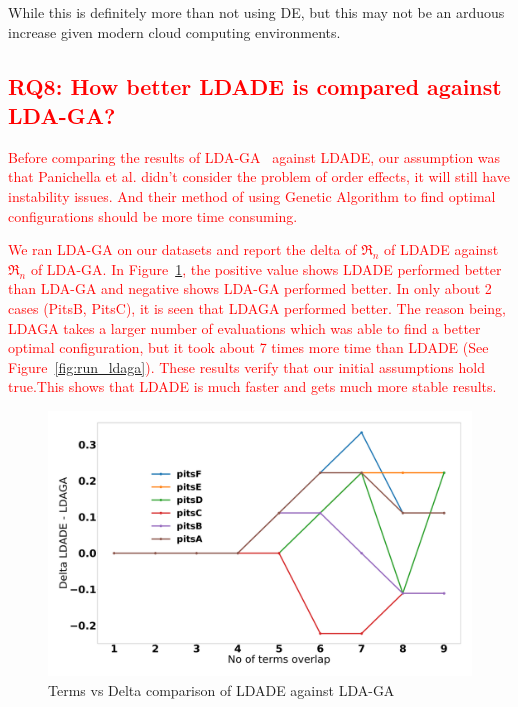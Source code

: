 \documentclass[twocolumn,5p,sort&compress]{elsarticle}
\theoremstyle{break}
\begin{document}
  While this is definitely more than not using DE, but this may not be an arduous increase
  given modern cloud computing environments.

\subsection{\textcolor{red}{\textbf{RQ8: How better LDADE is compared against LDA-GA?}}}

\textcolor{red}{Before comparing the results of LDA-GA~\cite{panichella2013effectively} against LDADE, our assumption was that Panichella et al. didn't consider the problem of order effects, it will still have instability issues. And their method of using Genetic Algorithm to find optimal configurations should be more time consuming.}

\textcolor{red}{We ran LDA-GA on our datasets and report the delta of $\Re_n$ of LDADE against $\Re_n$ of LDA-GA. In Figure~\ref{fig:ldaga}, the positive value shows LDADE performed better than LDA-GA and negative shows LDA-GA performed better. In only about 2 cases (PitsB, PitsC), it is seen that LDAGA performed better. The reason being, LDAGA takes a larger number of evaluations which was able to find a better optimal configuration, but it took about 7 times more time than LDADE (See Figure~\ref{fig:run_ldaga}). These results verify that our initial assumptions hold true.This shows that LDADE is much faster and gets much more stable results.}

\begin{figure}[!htbp]
  \includegraphics[width=\linewidth]{./fig/ldaga.png}
  \caption{Terms vs Delta comparison of LDADE against LDA-GA}
  \label{fig:ldaga}
\end{figure}
\end{document}
